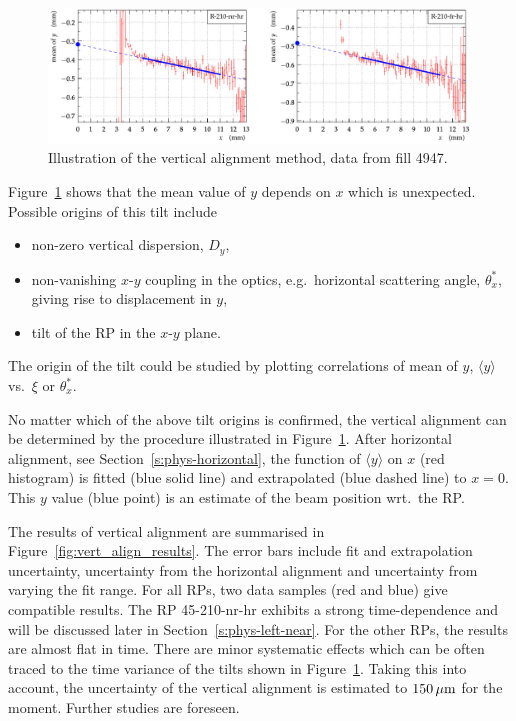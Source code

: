 \documentclass[TOTEM]{cern/cernphprep}
\def\un#1{\,{\rm #1}}
\begin{document}
\begin{figure}[h!]
\begin{center}
\includegraphics[width=0.8\hsize]{fig/physics_fills/y_alignment_method_example.pdf}
\caption{%
Illustration of the vertical alignment method, data from fill 4947.
}
\label{fig:vert_align_method}
\end{center}
\end{figure}



Figure~\ref{fig:vert_align_method} shows that the mean value of $y$ depends on $x$ which is unexpected. Possible origins of this tilt include
\begin{itemize}[nosep]
\item non-zero vertical dispersion, $D_y$,
\item non-vanishing $x$-$y$ coupling in the optics, e.g.~horizontal scattering angle, $\theta_x^*$, giving rise to displacement in $y$,
\item tilt of the RP in the $x$-$y$ plane.
\end{itemize}
The origin of the tilt could be studied by plotting correlations of mean of $y$, $\langle y\rangle$ vs.~$\xi$ or $\theta_x^*$.

No matter which of the above tilt origins is confirmed, the vertical alignment can be determined by the procedure illustrated in Figure~\ref{fig:vert_align_method}. After horizontal alignment, see Section~\ref{s:phys-horizontal}, the function of $\langle y\rangle$ on $x$ (red histogram) is fitted (blue solid line) and extrapolated (blue dashed line) to $x = 0$. This $y$ value (blue point) is an estimate of the beam position wrt.~the RP.

The results of vertical alignment are summarised in Figure~\ref{fig:vert_align_results}. The error bars include fit and extrapolation uncertainty, uncertainty from the horizontal alignment and uncertainty from varying the fit range. For all RPs, two data samples (red and blue) give compatible results. The RP 45-210-nr-hr exhibits a strong time-dependence and will be discussed later in Section~\ref{s:phys-left-near}. For the other RPs, the results are almost flat in time. There are minor systematic effects which can be often traced to the time variance of the tilts shown in Figure~\ref{fig:vert_align_method}. Taking this into account, the uncertainty of the vertical alignment is estimated to $150\un{\mu m}$ for the moment. Further studies are foreseen.
\end{document}
